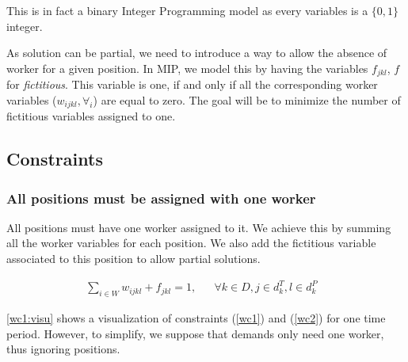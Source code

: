 \documentclass[../../thesis.tex]{subfiles}
\begin{document}
This is in fact a binary Integer Programming model as every variables is a $\{0, 1\}$ integer.

As solution can be partial, we need to introduce a way to allow the absence of worker for a 
given position. In MIP, we model this by having the variables $f_{jkl}$, $f$ for \emph{fictitious}. This variable is one, if and only if all the 
corresponding worker variables ($w_{ijkl}, \forall_i$) are equal to zero. The goal will be to minimize 
the number of fictitious variables assigned to one.

\subsection{Constraints}

\subsubsection{All positions must be assigned with one worker}

  All positions must have one worker assigned to it. We achieve this by summing all the worker variables 
  for each position. We also add the fictitious variable associated to this position to allow partial 
  solutions.

  \begin{align}
    \sum_{i \in W} w_{ijkl} + f_{jkl} = 1, && \forall k \in D, j \in d_k^T, l \in d_k^P & \label{wc1}
  \end{align}


\autoref{wc1:visu} shows a visualization of constraints (\ref{wc1}) and (\ref{wc2}) for one time period.
However, to simplify, we suppose that demands only need one worker, thus ignoring positions.
\end{document}
